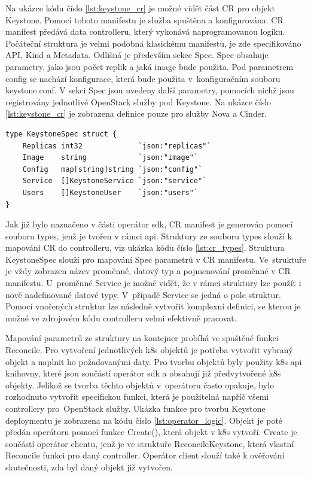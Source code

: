 Na ukázce kódu číslo \ref{lst:keystone_cr} je možné vidět část CR pro objekt Keystone. Pomocí tohoto manifestu je služba spuštěna a konfigurována. CR manifest předává data controlleru, který vykonává naprogramovanou logiku. Počáteční struktura je velmi podobná klasickému manifestu, je zde specifikováno API, Kind a Metadata. Odlišná je především sekce Spec. Spec obsahuje parametry, jako jsou počet replik a jaká image bude použita. Pod parametrem config se nachází konfigurace, která bude použita v konfiguračním souboru keystone.conf. V sekci Spec jsou uvedeny další parametry, pomocích nichž jsou registrovány jednotlivé OpenStack služby pod Keystone. Na ukázce číslo \ref{lst:keystone_cr} je zobrazena definice pouze pro služby Nova a Cinder.

\begin{lstlisting}[caption={Ukázka struktury KeystoneSpec, zdroj: vlastní tvorba},label={lst:cr_types}]
type KeystoneSpec struct {
	Replicas int32             `json:"replicas"`
	Image    string            `json:"image"`
	Config   map[string]string `json:"config"`
	Service  []KeystoneService `json:"service"`
	Users    []KeystoneUser    `json:"users"`
}
\end{lstlisting}

Jak již bylo naznačeno v části operátor sdk, CR manifest je generován pomocí souboru types, jenž je tvořen v rámci api. Struktury ze souboru types slouží k mapování CR do controlleru, viz ukázka kódu číslo \ref{lst:cr_types}. Struktura KeystoneSpec slouží pro mapování Spec parametrů v CR manifestu. Ve struktuře je vždy zobrazen název proměnné, datový typ a pojmenování proměnné v CR manifestu. U proměnné Service je možné vidět, že v rámci struktury lze použít i nově nadefinované datové typy. V případě Service se jedná o pole struktur. Pomocí vnořených struktur lze následně vytvořit komplexní definici, se kterou je možné ve zdrojovém kódu controlleru velmi efektivně pracovat.

Mapování parametrů ze struktury na kontejner probíhá ve spuštěné funkci Reconcile. Pro vytvoření jednotlivých k8s objektů je potřeba vytvořit vybraný objekt a naplnit ho požadovanými daty. Pro tvorbu objektů byly použity k8s api knihovny, které jsou součástí operátor sdk a obsahují již předvytvořené k8s objekty. Jelikož se tvorba těchto objektů v operátoru často opakuje, bylo rozhodnuto vytvořit specifickou funkci, která je použitelná napříč všemi controllery pro OpenStack služby. Ukázka funkce pro tvorbu Keystone deploymentu je zobrazena na kódu číslo \ref{lst:operator_logic}. Objekt je poté předán operátoru pomocí funkce Create(), která objekt v k8s vytvoří. Create je součástí operátor clientu, jenž je ve struktuře ReconcileKeystone, která vlastní Reconcile funkci pro daný controller. Operátor client slouží také k ověřování skutečnosti, zda byl daný objekt již vytvořen. 

